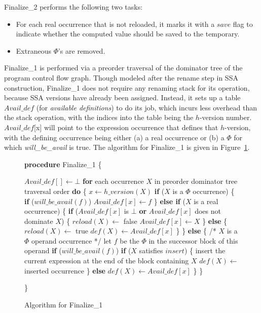Finalize\_2 performs the following two tasks:

\begin{itemize}
\item For each real occurrence that is not reloaded, it marks it with a
$save$ flag to indicate whether the computed value should be saved to the 
temporary.
\item Extraneous $\Phi$'s are removed.
\end{itemize}

Finalize\_1 is performed via a preorder traversal of the dominator tree
of the program control flow graph.  Though modeled after the rename step
in SSA construction, Finalize\_1 does not require any renaming stack for
its operation, because SSA versions have already been assigned.  Instead,
it sets up a table $Avail\_def$ (for \emph{available definitions}) to do its
job, which incurs less overhead than the stack operation, with the indices
into the table being the $h$-version number.  $Avail\_def$[x] will point
to the expression occurrence that defines that $h$-version, with the
defining occurrence being either (a) a real occurrence or (b) a $\Phi$ for
which \emph{will\_be\_avail} is true.  The algorithm for Finalize\_1 is
given in Figure~\ref{fig: finalize1}.

\begin{figure}[!ht]
{\bf procedure} Finalize\_1
\{
\begin{code}
 $Avail\_def[] \leftarrow \bot$
 {\bf for} each occurrence $X$ in preorder dominator tree traversal order {\bf do} \{
   $x \leftarrow h\_version(X)$
   {\bf if} ($X$ is a $\Phi$ occurrence) \{
	{\bf if} ($will\_be\_avail(f)$)
	  $Avail\_def[x] \leftarrow f$
   \}
   {\bf else if} ($X$ is a real occurrence) \{
	{\bf if} ($Avail\_def[x]$ is $\bot$ {\bf or} $Avail\_def[x]$ does not dominate $X$) \{
	  $reload(X) \leftarrow$ false
	  $Avail\_def[x] \leftarrow X$
	\}
	{\bf else} \{
	  $reload(X) \leftarrow$ true
	  $def(X) \leftarrow Avail\_def[x]$
	\}
   \}
   {\bf else} \{ /* $X$ is a $\Phi$ operand occurrence */
     let $f$ be the $\Phi$ in the successor block of this operand
	{\bf if} ($will\_be\_avail(f)$)
	  {\bf if} ($X$ satisfies $insert$) \{
	    insert the current expression at the end of the block containing $X$
	    $def(X) \leftarrow$ inserted occurrence
	  \}
	  {\bf else}
	    $def(X) \leftarrow Avail\_def[x]$
   \}
 \}
\end{code}
\}
\caption{Algorithm for Finalize\_1}
\label{fig: finalize1}
\end{figure}

